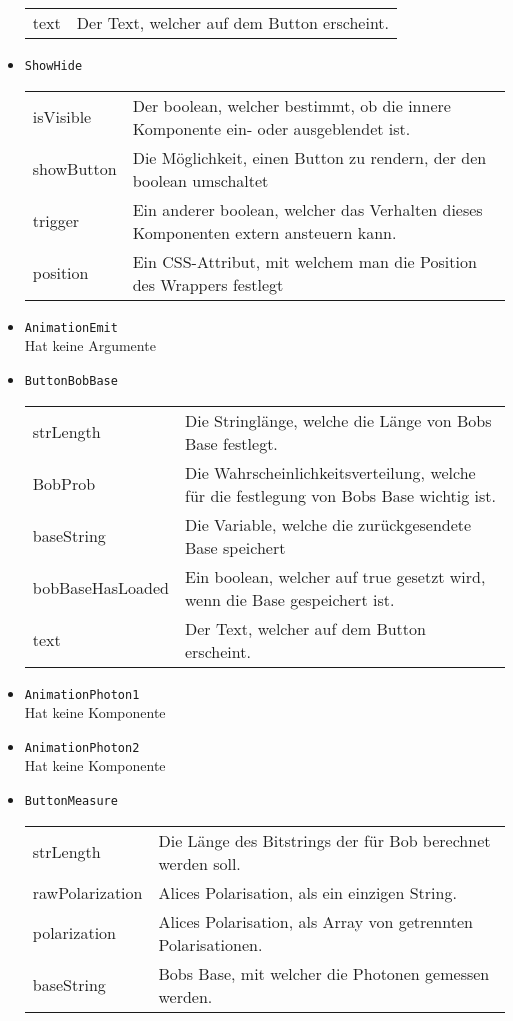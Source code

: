 \begin{itemize}
\begin{tabularx}{\textwidth}{p{3cm}p{11cm}}
text & Der Text, welcher auf dem Button erscheint.
\end{tabularx}
\item \texttt{ShowHide} \\
\begin{tabularx}{\textwidth}{p{3cm}p{11cm}} 
isVisible & Der boolean, welcher bestimmt, ob die innere Komponente ein- oder ausgeblendet ist. \\
showButton & Die Möglichkeit, einen Button zu rendern, der den boolean umschaltet \\
trigger & Ein anderer boolean, welcher das Verhalten dieses Komponenten extern ansteuern kann. \\
position & Ein CSS-Attribut, mit welchem man die Position des Wrappers festlegt 
\end{tabularx}
\item \texttt{AnimationEmit} \\
Hat keine Argumente
\item \texttt{ButtonBobBase} \\[3mm]
\begin{tabularx}{\textwidth}{p{3cm}p{11cm}} 
strLength & Die Stringlänge, welche die Länge von Bobs Base festlegt. \\
BobProb & Die Wahrscheinlichkeitsverteilung, welche für die festlegung von Bobs Base wichtig ist. \\
baseString & Die Variable, welche die zurückgesendete Base speichert \\
bobBaseHasLoaded & Ein boolean, welcher auf true gesetzt wird, wenn die Base gespeichert ist. \\ 
text & Der Text, welcher auf dem Button erscheint.
\end{tabularx}
\item \texttt{AnimationPhoton1} \\
Hat keine Komponente
\item \texttt{AnimationPhoton2} \\
Hat keine Komponente
\item \texttt{ButtonMeasure} \\
\begin{tabularx}{\textwidth}{p{3cm}p{11cm}} 
strLength & Die Länge des Bitstrings der für Bob berechnet werden soll. \\
rawPolarization & Alices Polarisation, als ein einzigen String. \\
polarization & Alices Polarisation, als Array von getrennten Polarisationen. \\
baseString &  Bobs Base, mit welcher die Photonen gemessen werden. \\

\end{tabularx}
\end{itemize}
